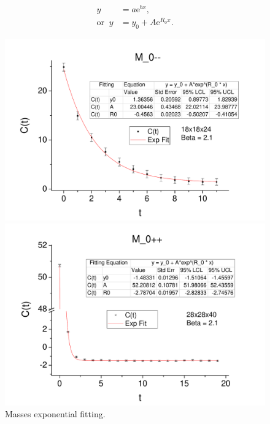 \documentclass[12pt]{article}
\begin{document}
\begin{align}
    y &= a\mathrm{e}^{bx},\\
    \mathrm{or} \; \; y &= y_0 + A\mathrm{e}^{R_0x}.
\end{align}

\begin{figure}
  \centering
  \begin{minipage}[c]{\linewidth}
    \includegraphics[width=\linewidth]{m--fit.pdf}
  \end{minipage}
  \begin{minipage}[c]{\linewidth}
    \includegraphics[width=\linewidth]{m++fit.pdf}
  \end{minipage}
\caption{Masses exponential fitting.}
\label{fig:massfitting}
\end{figure}
\end{document}
